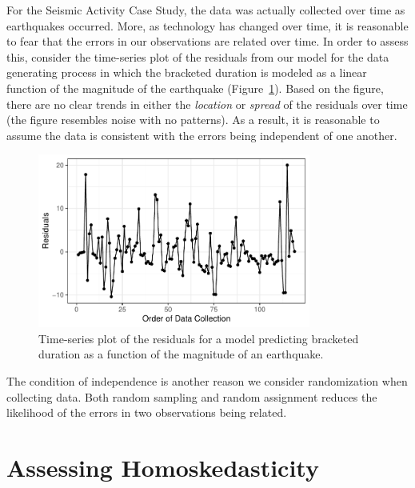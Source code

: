 \documentclass[
  letterpaper,
  DIV=11,
  numbers=noendperiod]{scrreprt}
\theoremstyle{plain}
\theoremstyle{definition}
\theoremstyle{definition}
\theoremstyle{remark}
\begin{document}
For the Seismic Activity Case Study, the data was actually collected
over time as earthquakes occurred. More, as technology has changed over
time, it is reasonable to fear that the errors in our observations are
related over time. In order to assess this, consider the time-series
plot of the residuals from our model for the data generating process in
which the bracketed duration is modeled as a linear function of the
magnitude of the earthquake
(Figure~\ref{fig-regassessment-independence}). Based on the figure,
there are no clear trends in either the \emph{location} or \emph{spread}
of the residuals over time (the figure resembles noise with no
patterns). As a result, it is reasonable to assume the data is
consistent with the errors being independent of one another.

\begin{figure}

{\centering \includegraphics[width=0.8\textwidth,height=\textheight]{./images/fig-regassessment-independence-1.pdf}

}

\caption{\label{fig-regassessment-independence}Time-series plot of the
residuals for a model predicting bracketed duration as a function of the
magnitude of an earthquake.}

\end{figure}

The condition of independence is another reason we consider
randomization when collecting data. Both random sampling and random
assignment reduces the likelihood of the errors in two observations
being related.

\hypertarget{assessing-homoskedasticity}{%
\section{Assessing Homoskedasticity}\label{assessing-homoskedasticity}}
\end{document}
